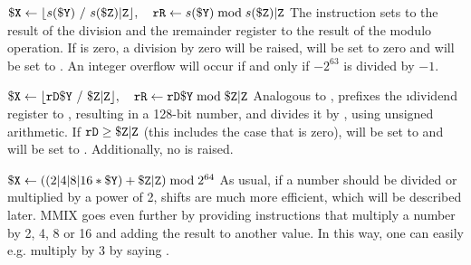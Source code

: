\instrtbl
	{}
	{${\tt \$X} \leftarrow \lfloor s({\tt \$Y})~/~s({\tt \$Z}){\tt|Z}\rfloor,\quad
	{\tt rR} \leftarrow s({\tt \$Y}) \bmod s({\tt \$Z}){\tt|Z}$}
\noindent The instruction  sets  to the result of the division and the \i{remainder register}  to the result of the modulo operation. If  is zero, a division by zero  will be raised,  will be set to zero and  will be set to . An integer overflow  will occur if and only if $-2^{63}$ is divided by $-1$. \citep[pg. 14]{mmix-doc}

\instrtbl
	{}
	{${\tt \$X} \leftarrow \lfloor {\tt rD}{\tt \$Y}~/~{\tt \$Z}{\tt|Z}\rfloor,\quad
	{\tt rR} \leftarrow {\tt rD}{\tt \$Y} \bmod {\tt \$Z}{\tt|Z}$}
\noindent Analogous to ,  prefixes the \i{dividend register}  to , resulting in a 128-bit number, and divides it by , using unsigned arithmetic. If ${\tt rD} \ge {\tt \$Z}{\tt|Z}$ (this includes the case that  is zero),  will be set to  and  will be set to . Additionally, no  is raised. \citep[pg. 14]{mmix-doc}

\medskip

\instrtbl
	{}
	{${\tt \$X} \leftarrow ((2|4|8|16 * {\tt \$Y}) + {\tt \$Z}{\tt|Z}) \bmod 2^{64}$}
\noindent As usual, if a number should be divided or multiplied by a power of 2, shifts are much more efficient, which will be described later. MMIX goes even further by providing instructions that multiply a number by 2, 4, 8 or 16 and adding the result to another value. In this way, one can easily e.g. multiply by 3 by saying . \citep[pg. 6]{mmix-doc}

